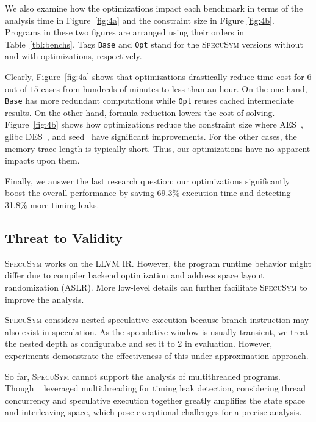 \documentclass[sigconf]{acmart}
\newcommand{\SpecuSym}{\textsc{SpecuSym} }
\begin{document}
We also examine how the optimizations impact each benchmark in terms of 
the analysis time in Figure~\ref{fig:4a} and the constraint size in Figure
\ref{fig:4b}. Programs in these two figures are arranged using their orders 
in Table~\ref{tbl:benchs}. Tags \texttt{Base} and \texttt{Opt} stand for the 
\SpecuSym versions without and with optimizations, respectively. 


Clearly, Figure~\ref{fig:4a} shows that optimizations drastically reduce 
time cost for $6$ out of $15$ cases from hundreds of minutes to less than 
an hour. On the one hand, \texttt{Base} has more redundant computations 
while \texttt{Opt} reuses cached intermediate results. On the other hand, 
formula reduction lowers the cost of solving. Figure~\ref{fig:4b} shows 
how optimizations reduce the constraint size where AES~\cite{LibTomCrypt}, 
glibc DES~\cite{glibc}, and seed~\cite{Tegra} have significant improvements. 
For the other cases, the memory trace length is typically short. Thus, our 
optimizations have no apparent impacts upon them.


Finally, we answer the last research question: our optimizations significantly 
boost the overall performance by saving 69.3\% execution time and detecting 
31.8\% more timing leaks.



\subsection{Threat to Validity}
\label{sec:threat}

\SpecuSym works on the LLVM IR. However, the program runtime behavior might 
differ due to compiler backend optimization and address space layout 
randomization (ASLR). More low-level details can further facilitate \SpecuSym 
to improve the analysis.


\SpecuSym considers nested speculative execution because branch instruction 
may also exist in speculation. As the speculative window is usually transient, 
we treat the nested depth as configurable and set it to 2 in evaluation. 
However, experiments demonstrate the effectiveness of this under-approximation 
approach.
	

So far, \SpecuSym cannot support the analysis of multithreaded programs. Though 
{}~\cite{GuoWW18} leveraged multithreading for timing leak detection, 
considering thread concurrency and speculative execution together greatly amplifies 
the state space and interleaving space, which pose exceptional challenges for a 
precise analysis.
\end{document}
